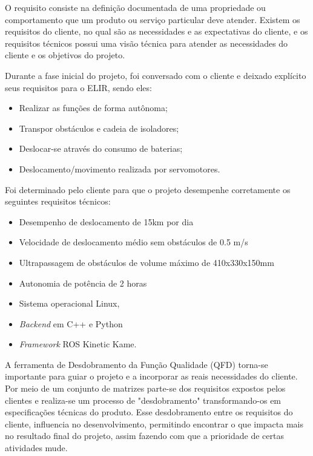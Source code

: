 O requisito consiste na definição documentada  de uma propriedade ou comportamento que um produto ou serviço particular deve atender. Existem os requisitos do cliente, no qual são as necessidades e as expectativas do cliente, e os requisitos técnicos possui uma visão técnica para atender as necessidades do cliente e os objetivos do projeto.

Durante a fase inicial do projeto, foi conversado com o cliente e deixado explícito seus requisitos para o ELIR, sendo eles:

\begin{itemize}
	\item Realizar as funções de forma autônoma;
	
	\item Transpor obstáculos e cadeia de isoladores;
	
	\item Deslocar-se através do consumo de baterias;
	
    \item Deslocamento/movimento realizada por servomotores.
    
\end{itemize}

Foi determinado pelo cliente para que o projeto desempenhe corretamente os seguintes requisitos técnicos:
\begin{itemize}
	\item Desempenho de deslocamento de 15km por dia
	
	
	\item Velocidade de deslocamento médio  sem obstáculos de 0.5 m/s
	
	
	\item Ultrapassagem de obstáculos de volume máximo de  410x330x150mm
	
	\item Autonomia de potência de 2 horas
    \item Sistema operacional Linux, 
	\item \textit{Backend} em C++ e Python
	\item \textit{Framework} ROS Kinetic Kame.
	
	
\end{itemize}

A ferramenta de Desdobramento da Função Qualidade (QFD) torna-se importante para guiar o projeto e a incorporar as reais necessidades do cliente.  Por meio de um conjunto de matrizes parte-se dos requisitos expostos pelos clientes e realiza-se um processo de "desdobramento" transformando-os em especificações técnicas do produto. Esse desdobramento entre os requisitos do cliente, influencia no desenvolvimento, permitindo encontrar o que impacta mais no resultado final do projeto, assim fazendo com que a prioridade de certas atividades mude.

